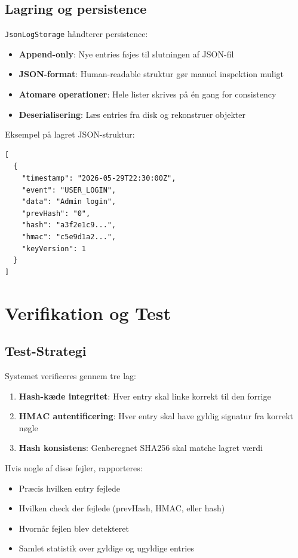 \documentclass[12pt, a4paper, danish]{article}
\begin{document}
\subsection{Lagring og persistence}

\texttt{JsonLogStorage} håndterer persistence:

\begin{itemize}
    \item \textbf{Append-only}: Nye entries føjes til slutningen af JSON-fil
    \item \textbf{JSON-format}: Human-readable struktur gør manuel inspektion muligt
    \item \textbf{Atomare operationer}: Hele lister skrives på én gang for consistency
    \item \textbf{Deserialisering}: Læs entries fra disk og rekonstruer objekter
\end{itemize}

Eksempel på lagret JSON-struktur:
\begin{lstlisting}
[
  {
    "timestamp": "2026-05-29T22:30:00Z",
    "event": "USER_LOGIN",
    "data": "Admin login",
    "prevHash": "0",
    "hash": "a3f2e1c9...",
    "hmac": "c5e9d1a2...",
    "keyVersion": 1
  }
]
\end{lstlisting}

\newpage
\section{Verifikation og Test}

\subsection{Test-Strategi}

Systemet verificeres gennem tre lag:

\begin{enumerate}
    \item \textbf{Hash-kæde integritet}: Hver entry skal linke korrekt til den forrige
    \item \textbf{HMAC autentificering}: Hver entry skal have gyldig signatur fra korrekt nøgle
    \item \textbf{Hash konsistens}: Genberegnet SHA256 skal matche lagret værdi
\end{enumerate}

Hvis nogle af disse fejler, rapporteres:
\begin{itemize}
    \item Præcis hvilken entry fejlede
    \item Hvilken check der fejlede (prevHash, HMAC, eller hash)
    \item Hvornår fejlen blev detekteret
    \item Samlet statistik over gyldige og ugyldige entries
\end{itemize}
\end{document}
